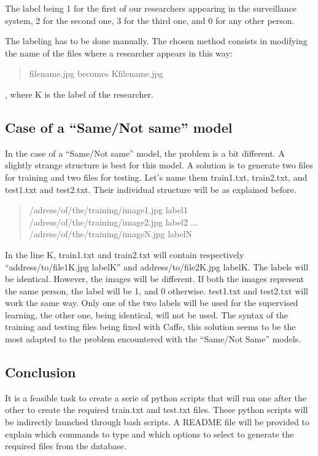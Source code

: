 The label being 1 for the first of our researchers appearing in the surveillance system, 2 for the second one, 3 for the third one, and 0 for any other person.

The labeling has to be done manually. The chosen method consists in modifying the name of the files where a researcher appears in this way:

\blockquote{filename.jpg becomes Kfilename.jpg}, where K is the label of the researcher.


\subsection{Case of a \enquote{Same/Not same} model}

In the case of a \enquote{Same/Not same} model, the problem is a bit different. A slightly strange structure is best for this model. A solution is to generate two files for training and two files for testing. Let's name them train1.txt, train2.txt, and test1.txt and test2.txt. Their individual structure will be as explained before.

\blockquote{/adress/of/the/training/image1.jpg label1\newline
/adress/of/the/training/image2.jpg label2\newline
...\newline
/adress/of/the/training/imageN.jpg labelN}

In the line K, train1.txt and train2.txt will contain respectively \enquote{address/to/file1K.jpg labelK} and {address/to/file2K.jpg labelK}. The labels will be identical. However, the images will be different. If both the images represent the same person, the label will be 1, and 0 otherwise. test1.txt and test2.txt will work the same way. Only one of the two labels will be used for the supervised learning, the other one, being identical, will not be used. The syntax of the training and testing files being fixed with Caffe, this solution seems to be the most adapted to the problem encountered with the \enquote{Same/Not Same} models.


\subsection{Conclusion}
It is a feasible task to create a serie of python scripts that will run one after the other to create the required train.txt and test.txt files. These python scripts will be indirectly launched through bash scripts. A README file will be provided to explain which commands to type and which options to select to generate the required files from the database.\\

